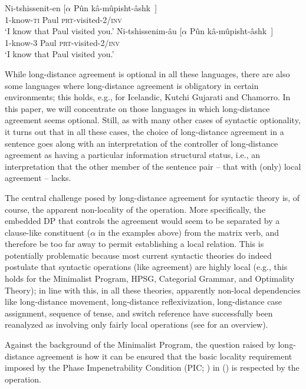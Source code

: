 \documentclass[output=paper
,modfonts
,nonflat]{langsci/langscibook}
\begin{document}
\ea\label{ex:mueller:5}
\ea 
\gll Ni-tshissenit-en [$\alpha$ P\^{u}n k\^{a}-m\^{u}pisht-\^{a}shk~] \\
     1-know-{{\scshape ti}} {} Paul {\scshape prt}-visited-2/{\scshape inv} \\
\glt `I know that Paul visited you.'
\ex
\gll Ni-tshissenim-{\^a}u [$\alpha$ P\^{u}n k\^{a}-m\^{u}pisht-\^{a}shk~] \\
     1-know-{3} {} {Paul} {\scshape prt}-visited-2/{\scshape inv} \\
\glt `I know that Paul visited you.'
\z
\z

While long-distance agreement is optional in all these languages,
there are also some languages where long-distance agreement is
obligatory in certain environments; this holds, e.g., for Icelandic,
Kutchi Gujarati and Chamorro.  In this paper, we will concentrate on
those languages in which long-distance agreement seems
optional. Still, as with many other cases of syntactic optionality, it
turns out that in all these cases, the choice of long-distance
agreement in a sentence goes along with an interpretation of the
controller of long-distance agreement as having a particular
information structural status, i.e., an interpretation that the other
member of the sentence pair -- that with (only) local agreement --
lacks. 

The central challenge posed by long-distance agreement for syntactic
theory is, of course, the apparent non-locality of the operation. More
specifically, the embedded DP that controls the agreement would seem
to be separated by a clause-like constituent ($\alpha$ in the examples
above) from the matrix verb, and therefore be too far away to permit
establishing a local relation.  This is potentially problematic
because most current syntactic theories do indeed postulate that
syntactic operations (like agreement) are highly local (e.g., this
holds for the Minimalist Program, HPSG, Categorial Grammar, and Optimality
Theory); in line with this, in all these theories, apparently
non-local dependencies like long-distance movement, long-distance
reflexivization, long-distance case assignment, sequence of tense, and
switch reference have successfully been reanalyzed as involving only
fairly local operations (see \cite*{Alexiadouetal:12} for an
overview).

Against the background of the Minimalist Program, the question raised
by long-distance agreement is how it can be ensured that the basic
locality requirement imposed by the Phase Impenetrability Condition
(PIC; \cite{Chomsky:00,Chomsky:01,Chomsky:08,Chomsky:13}) in (\Next) is
respected by the operation. 
\end{document}
